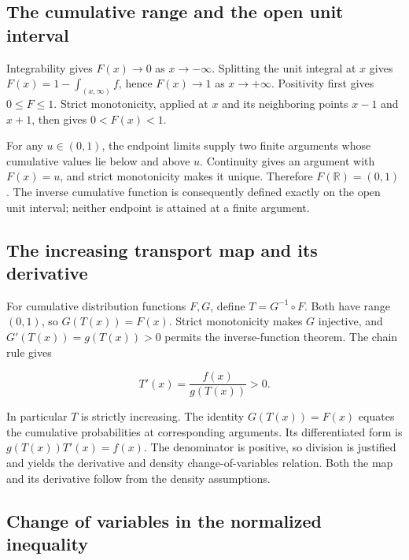 \documentclass[11pt,a4paper]{article}
\begin{document}
\subsection{\texorpdfstring{The cumulative range and the open unit interval}{The cumulative range and the open unit interval}}


Integrability gives \(F(x)\to0\) as \(x\to-\infty\). Splitting the unit integral at \(x\) gives \(F(x)=1-\int_{(x,\infty)}f\), hence \(F(x)\to1\) as \(x\to+\infty\). Positivity first gives \(0\le F\le1\). Strict monotonicity, applied at \(x\) and its neighboring points \(x-1\) and \(x+1\), then gives \(0<F(x)<1\).



For any \(u\in(0,1)\), the endpoint limits supply two finite arguments whose cumulative values lie below and above \(u\). Continuity gives an argument with \(F(x)=u\), and strict monotonicity makes it unique. Therefore \(F(\mathbb R)=(0,1)\). The inverse cumulative function is consequently defined exactly on the open unit interval; neither endpoint is attained at a finite argument.


\subsection{\texorpdfstring{The increasing transport map and its derivative}{The increasing transport map and its derivative}}


For cumulative distribution functions \(F,G\), define \(T=G^{-1}\circ F\). Both have range \((0,1)\), so \(G(T(x))=F(x)\). Strict monotonicity makes \(G\) injective, and \(G'(T(x))=g(T(x))>0\) permits the inverse-function theorem. The chain rule gives

\[T'(x)=\frac{f(x)}{g(T(x))}>0.\]

In particular \(T\) is strictly increasing. The identity \(G(T(x))=F(x)\) equates the cumulative probabilities at corresponding arguments. Its differentiated form is \(g(T(x))T'(x)=f(x)\). The denominator is positive, so division is justified and yields the derivative and density change-of-variables relation. Both the map and its derivative follow from the density assumptions.




\subsection{\texorpdfstring{Change of variables in the normalized inequality}{Change of variables in the normalized inequality}}
\end{document}
